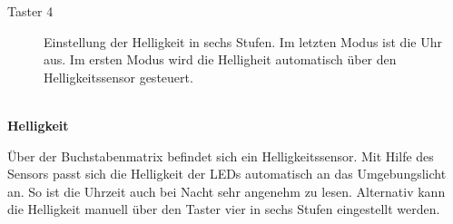 \begin{multicols}{2}
\begin{description}
\item[Taster 4] Einstellung der Helligkeit in sechs Stufen. Im letzten Modus ist die Uhr aus. Im ersten Modus wird die Helligheit automatisch über den Helligkeitssensor gesteuert.
\end {description}
 \ \\
\textbf{Helligkeit}

Über der Buchstabenmatrix befindet sich ein Helligkeitssensor. Mit Hilfe des Sensors passt sich die Helligkeit der LEDs automatisch an das Umgebungslicht an. So ist die Uhrzeit auch bei Nacht sehr angenehm zu lesen. Alternativ kann die Helligkeit manuell über den Taster vier in sechs Stufen eingestellt werden.

\end{multicols}